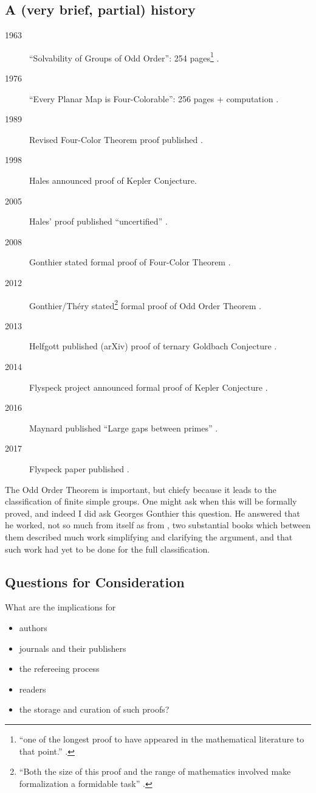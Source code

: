 \subsection{A (very brief, partial) history}
\begin{description}
\item[1963]``Solvability of Groups of Odd Order'': 254 pages\footnote{``one of the longest proof to have appeared in the mathematical literature to that point.'' \cite{Gonthieretal2013a}.} \cite{FeitThompson1963}.
\item[1976]``Every Planar Map is Four-Colorable'': 256 pages + computation \cite{AppelHaken1976a}.
\item[1989]Revised Four-Color Theorem proof published \cite{AppelHaken1989}.
\item[1998]Hales announced proof of Kepler Conjecture.
\item[2005]Hales' proof published ``uncertified'' \cite{Hales2005}.
\item[2008]Gonthier stated formal proof of Four-Color Theorem \cite{Gonthier2008}.
\item[2012]Gonthier/Th\'ery stated\footnote{``Both the size of this proof and the range of mathematics involved make formalization
a formidable task'' \cite{Gonthieretal2013a}.} formal proof of Odd Order Theorem \cite{GonthierThery2012a,Gonthieretal2013a}.
\item[2013]Helfgott published (arXiv) proof of ternary Goldbach Conjecture \cite{Helfgott2013a}.
\item[2014]Flyspeck project announced formal proof of Kepler Conjecture \cite{Hales2014a}.
\item[2016]Maynard published ``Large gaps between primes'' \cite{Maynard2016a}.
\item[2017]Flyspeck paper published \cite{Halesetal2017a}.
\end{description}
The Odd Order Theorem is important, but chiefy because it leads to the classification of finite simple groups. One might ask when this will be formally proved, and indeed I did ask Georges Gonthier this question. He answered that he worked, not so much from \cite{FeitThompson1963} itself as from \cite{Benderetal1994,Peterfalvi2000}, two substantial books which between them described much work simplifying  and clarifying the argument, and that such work had yet to be done for the full classification.
\subsection{Questions for Consideration}
What are the implications for
\begin{itemize}
\item authors
\item journals and their publishers
\item the refereeing process
\item readers
\item the storage and curation of such proofs?%
\end{itemize}

